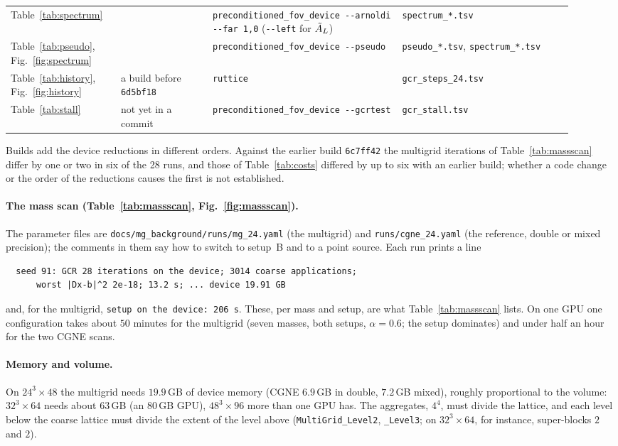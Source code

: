 \begin{table}[h]
\begin{tabular}{@{}>{\raggedright\arraybackslash}p{0.17\linewidth}>{\raggedright\arraybackslash}p{0.15\linewidth}>{\raggedright\arraybackslash}p{0.31\linewidth}>{\raggedright\arraybackslash}p{0.29\linewidth}@{}}
Table~\ref{tab:spectrum} & & \texttt{preconditioned\_fov\_device -{}-arnoldi -{}-far 1,0} (\texttt{-{}-left} for $\tilde A_{L}$) & \texttt{spectrum\_*.tsv}\\
Table~\ref{tab:pseudo}, Fig.~\ref{fig:spectrum} & & \texttt{preconditioned\_fov\_device -{}-pseudo} & \texttt{pseudo\_*.tsv}, \texttt{spectrum\_*.tsv}\\
Table~\ref{tab:history}, Fig.~\ref{fig:history} & a build before \texttt{6d5bf18} & \texttt{ruttice} & \texttt{gcr\_steps\_24.tsv}\\
Table~\ref{tab:stall} & not yet in a commit & \texttt{preconditioned\_fov\_device -{}-gcrtest} & \texttt{gcr\_stall.tsv}\\
\bottomrule
\end{tabular}
\end{table}

Builds add the device reductions in different orders. Against the earlier build \texttt{6c7ff42}
the multigrid iterations of Table~\ref{tab:massscan} differ by one or two in six of the 28 runs,
and those of Table~\ref{tab:costs} differed by up to six with an earlier build; whether a code
change or the order of the reductions causes the first is not established.

\paragraph{The mass scan (Table~\ref{tab:massscan}, Fig.~\ref{fig:massscan}).} The
parameter files are \texttt{docs/mg\_background/runs/mg\_24.yaml} (the multigrid) and
\texttt{runs/cgne\_24.yaml} (the reference, double or mixed precision); the comments
in them say how to switch to setup~B and to a point source. Each run prints a line
{\small
\begin{verbatim}
  seed 91: GCR 28 iterations on the device; 3014 coarse applications;
      worst |Dx-b|^2 2e-18; 13.2 s; ... device 19.91 GB
\end{verbatim}}
and, for the multigrid, \texttt{setup on the device: 206 s}. These, per mass and
setup, are what Table~\ref{tab:massscan} lists. On one GPU one configuration takes about
$50$ minutes for the multigrid (seven masses, both setups, $\alpha=0.6$; the setup
dominates) and under half an hour for the two CGNE scans.

\paragraph{Memory and volume.} On $24^3\times48$ the multigrid needs $19.9$\,GB of
device memory (CGNE $6.9$\,GB in double, $7.2$\,GB mixed), roughly proportional to the
volume: $32^3\times64$ needs about $63$\,GB (an $80$\,GB GPU), $48^3\times96$ more
than one GPU has. The aggregates, $4^4$, must divide the lattice, and each level
below the coarse lattice must divide the extent of the level above
(\texttt{MultiGrid\_Level2}, \texttt{\_Level3}; on $32^3\times64$, for instance,
super-blocks $2$ and $2$).


